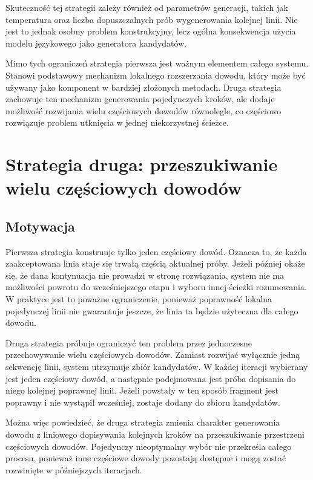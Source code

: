 \documentclass[shortabstract]{iithesis}
\theoremstyle{definition}
\theoremstyle{remark}
\theoremstyle{plain}
\begin{document}
Skuteczność tej strategii zależy również od parametrów generacji, takich jak
temperatura oraz liczba dopuszczalnych prób wygenerowania kolejnej linii. Nie jest
to jednak osobny problem konstrukcyjny, lecz ogólna konsekwencja użycia modelu
językowego jako generatora kandydatów.

Mimo tych ograniczeń strategia pierwsza jest ważnym elementem całego systemu.
Stanowi podstawowy mechanizm lokalnego rozszerzania dowodu, który może być
używany jako komponent w bardziej złożonych metodach. Druga strategia zachowuje
ten mechanizm generowania pojedynczych kroków, ale dodaje możliwość rozwijania
wielu częściowych dowodów równolegle, co częściowo rozwiązuje problem utknięcia
w jednej niekorzystnej ścieżce.


\section{Strategia druga: przeszukiwanie wielu częściowych dowodów}

\subsection{Motywacja}

Pierwsza strategia konstruuje tylko jeden częściowy dowód. Oznacza to, że każda
zaakceptowana linia staje się trwałą częścią aktualnej próby. Jeżeli później okaże się,
że dana kontynuacja nie prowadzi w stronę rozwiązania, system nie ma możliwości
powrotu do wcześniejszego etapu i wyboru innej ścieżki rozumowania. W praktyce
jest to poważne ograniczenie, ponieważ poprawność lokalna pojedynczej linii nie
gwarantuje jeszcze, że linia ta będzie użyteczna dla całego dowodu.

Druga strategia próbuje ograniczyć ten problem przez jednoczesne przechowywanie
wielu częściowych dowodów. Zamiast rozwijać wyłącznie jedną sekwencję linii, system
utrzymuje zbiór kandydatów. W każdej iteracji wybierany jest jeden częściowy dowód,
a następnie podejmowana jest próba dopisania do niego kolejnej poprawnej linii.
Jeżeli powstały w ten sposób fragment jest poprawny i nie wystąpił wcześniej, zostaje
dodany do zbioru kandydatów.

Można więc powiedzieć, że druga strategia zmienia charakter generowania dowodu
z liniowego dopisywania kolejnych kroków na przeszukiwanie przestrzeni częściowych
dowodów. Pojedynczy nieoptymalny wybór nie przekreśla całego procesu, ponieważ
inne częściowe dowody pozostają dostępne i mogą zostać rozwinięte w późniejszych
iteracjach.
\end{document}
